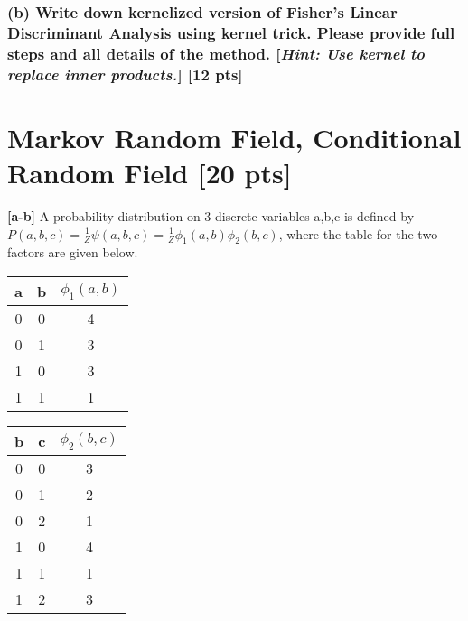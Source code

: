 \documentclass[twoside,11pt]{article}\usepackage{amsmath,amsfonts,amsthm,fullpage}
\begin{document}
\subsubsection*{(b) Write down kernelized version of Fisher's Linear Discriminant Analysis using kernel trick. Please provide full steps and all details of the method. [\emph{Hint: Use kernel to replace inner products.}] [12 pts]}
 
 

\section{Markov Random Field, Conditional Random Field [20 pts]}

\textbf{[a-b]} A probability distribution on  3 discrete variables
a,b,c is defined by $P(a,b,c) = \frac{1}{Z}\psi(a,b,c) =
\frac{1}{Z}\phi_1(a,b)\phi_2(b,c)$, where the table for the two
factors are given below.

\begin{table}[!htb]

    \begin{minipage}{.5\linewidth}

      \centering

    \begin{tabular}{cc|c}
    a & b & $\phi_1(a,b)$ \\ \hline
    0 & 0 & 4             \\
    0 & 1 & 3             \\
    1 & 0 & 3             \\
    1 & 1 & 1             \\
    \end{tabular}

    \end{minipage}%
    \begin{minipage}{.5\linewidth}
      \centering
     \begin{tabular}{cc|c}
    b & c & $\phi_2(b,c)$ \\ \hline
    0 & 0 & 3             \\
    0 & 1 & 2             \\
    0 & 2 & 1             \\
    1 & 0 & 4             \\
    1 & 1 & 1             \\
    1 & 2 & 3             \\
    \end{tabular}
    \end{minipage}
\end{table}
\end{document}
